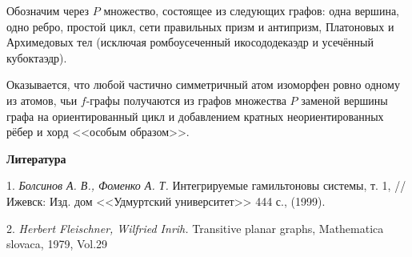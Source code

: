 	Обозначим через $P$ множество, состоящее из следующих графов: одна вершина, одно ребро, простой цикл, сети правильных призм и антипризм, Платоновых и Архимедовых тел (исключая ромбоусеченный икосододекаэдр и усечённый кубоктаэдр).



 Оказывается, что любой частично симметричный атом изоморфен ровно одному из атомов, чьи $f$-графы получаются из графов множества $P$ заменой вершины графа на ориентированный цикл и добавлением кратных неориентированных рёбер и хорд <<особым образом>>.






\smallskip \centerline {\bf Литература} \nopagebreak

1. {\it Болсинов А. В., Фоменко А. Т.} Интегрируемые гамильтоновы системы, т. 1, // Ижевск: Изд. дом <<Удмуртский университет>> 444 с., (1999).

2. {\it Herbert Fleischner, Wilfried Inrih.} Transitive planar graphs, Mathematica slovaca, 1979, Vol.29
